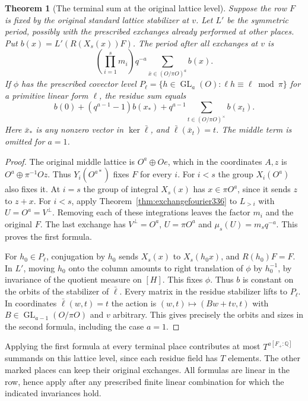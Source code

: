 \documentclass[a4paper,11pt]{article}
\newtheorem{theorem}[proposition]{Theorem}
\theoremstyle{definition}
\theoremstyle{remark}
\numberwithin{equation}{section}
\newcommand{\GL}{\operatorname{GL}}
\begin{document}
\begin{theorem}[The terminal sum at the original lattice level]\label{thm:terminalexchange336}
Suppose the row \(F\) is fixed by the original standard lattice
stabilizer at \(v\). Let \(L'\) be the symmetric period, possibly
with the prescribed exchanges already performed at other places.
Put \(b(x)=L'(R(X_s(x))F)\). The period after all exchanges at
\(v\) is
\[
 \left(\prod_{i=1}^s m_i\right) q^{-a}
                      \sum_{\bar x\in (O/\pi O)^a} b(x).
\]
If \(\phi\) has the prescribed covector level
\(P_\ell=\{h\in\GL_a(O):\ell h\equiv\ell\bmod\pi\}\)
for a primitive linear form \(\ell\), the residue sum equals
\[
 b(0)+(q^{a-1}-1)b(x_*)+
             q^{a-1}\sum_{t\in (O/\pi O)^\times} b(x_t).
\]
Here \(\bar x_*\) is any nonzero vector in \(\ker\bar\ell\), and
\(\bar\ell(\bar x_t)=t\). The middle term is omitted for \(a=1\).
\end{theorem}
\begin{proof}
The original middle lattice is \(O^a\oplus Oe\), which in the
coordinates \(A,z\) is \(O^a\oplus\pi^{-1}Oz\). Thus
\(Y_i(O^{a*})\) fixes \(F\) for every \(i\). For \(i<s\) the
group \(X_i(O^a)\) also fixes it. At \(i=s\) the group of
integral \(X_s(x)\) has \(x\in\pi O^a\), since it sends \(z\)
to \(z+x\). For \(i<s\), apply
Theorem~\ref{thm:exchangefourier336} to \(L_{>i}\) with
\(U=O^a=V^\perp\). Removing each of these integrations leaves
the factor \(m_i\) and the original \(F\).
The last exchange has \(V^\perp=O^a\), \(U=\pi O^a\) and
\(\mu_s(U)=m_s q^{-a}\). This proves the first formula.

For \(h_0\in P_\ell\), conjugation by \(h_0\) sends
\(X_s(x)\) to \(X_s(h_0x)\), and \(R(h_0)F=F\).
In \(L'\), moving \(h_0\) onto the column amounts to right
translation of \(\phi\) by \(h_0^{-1}\), by invariance of the
quotient measure on \([H]\). This fixes \(\phi\).
Thus \(b\) is constant on the orbits of the stabilizer of
\(\bar\ell\). Every matrix in the residue stabilizer lifts to
\(P_\ell\). In coordinates \(\bar\ell(w,t)=t\) the action is
\((w,t)\mapsto(Bw+tv,t)\) with \(B\in\GL_{a-1}(O/\pi O)\)
and \(v\) arbitrary. This gives precisely the orbits and sizes
in the second formula, including the case \(a=1\).
\end{proof}

Applying the first formula at every terminal place contributes
at most \(T^{a[F_+:\mathbb Q]}\) summands on this lattice level,
since each residue field has \(T\) elements. The other marked
places can keep their original exchanges. All formulas are linear
in the row, hence apply after any prescribed finite linear
combination for which the indicated invariances hold.
\end{document}
